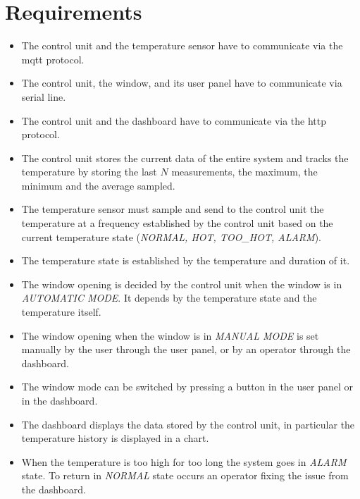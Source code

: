 \documentclass[a4paper,12pt]{report}
\begin{document}
    \section{Requirements}

        \begin{itemize}
            \item The control unit and the temperature sensor have to communicate via the mqtt protocol.
            \item The control unit, the window, and its user panel have to communicate via serial line.
            \item The control unit and the dashboard have to communicate via the http protocol.
            \item The control unit stores the current data of the entire system and tracks the temperature by storing the last
            $N$ measurements, the maximum, the minimum and the average sampled.
            \item The temperature sensor must sample and send to the control unit the temperature at a frequency established by
            the control unit based on the current temperature state (\textit{NORMAL, HOT, TOO\_HOT, ALARM}).
            \item The temperature state is established by the temperature and duration of it.
            \item The window opening is decided by the control unit when the window is in \textit{AUTOMATIC MODE}. It depends by
            the temperature state and the temperature itself.
            \item The window opening when the window is in \textit{MANUAL MODE} is set manually by the user through the user panel,
            or by an operator through the dashboard.
            \item The window mode can be switched by pressing a button in the user panel or in the dashboard.
            \item The dashboard displays the data stored by the control unit, in particular the temperature history is displayed
            in a chart.
            \item When the temperature is too high for too long the system goes in \textit{ALARM} state. To return in
            \textit{NORMAL} state occurs an operator fixing the issue from the dashboard.
        \end{itemize}
\end{document}
